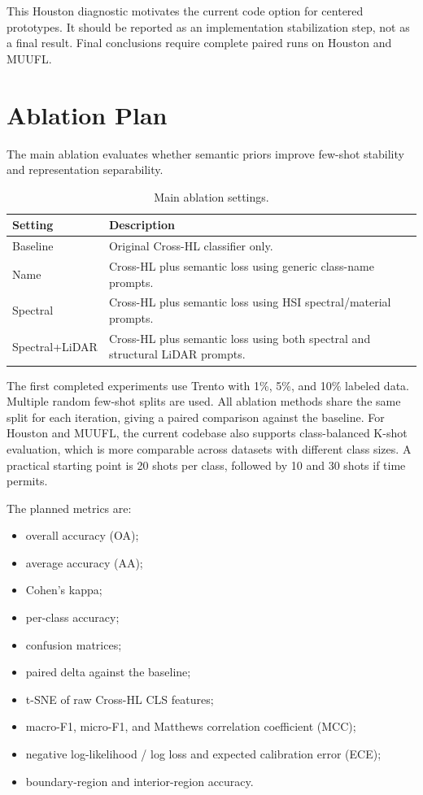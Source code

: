 \documentclass[10pt,journal,compsoc]{IEEEtran}
\begin{document}
This Houston diagnostic motivates the current code option for centered prototypes. It should be reported as an implementation stabilization step, not as a final result. Final conclusions require complete paired runs on Houston and MUUFL.

\section{Ablation Plan}

The main ablation evaluates whether semantic priors improve few-shot stability and representation separability.

\begin{table}[t]
\centering
\caption{Main ablation settings.}
\label{tab:ablation}
\begin{tabularx}{\columnwidth}{lX}
\toprule
\textbf{Setting} & \textbf{Description} \\
\midrule
Baseline & Original Cross-HL classifier only. \\
Name & Cross-HL plus semantic loss using generic class-name prompts. \\
Spectral & Cross-HL plus semantic loss using HSI spectral/material prompts. \\
Spectral+LiDAR & Cross-HL plus semantic loss using both spectral and structural LiDAR prompts. \\
\bottomrule
\end{tabularx}
\end{table}

The first completed experiments use Trento with 1\%, 5\%, and 10\% labeled data. Multiple random few-shot splits are used. All ablation methods share the same split for each iteration, giving a paired comparison against the baseline. For Houston and MUUFL, the current codebase also supports class-balanced K-shot evaluation, which is more comparable across datasets with different class sizes. A practical starting point is 20 shots per class, followed by 10 and 30 shots if time permits.

The planned metrics are:

\begin{itemize}
    \item overall accuracy (OA);
    \item average accuracy (AA);
    \item Cohen's kappa;
    \item per-class accuracy;
    \item confusion matrices;
    \item paired delta against the baseline;
    \item t-SNE of raw Cross-HL CLS features;
    \item macro-F1, micro-F1, and Matthews correlation coefficient (MCC);
    \item negative log-likelihood / log loss and expected calibration error (ECE);
    \item boundary-region and interior-region accuracy.
\end{itemize}
\end{document}
